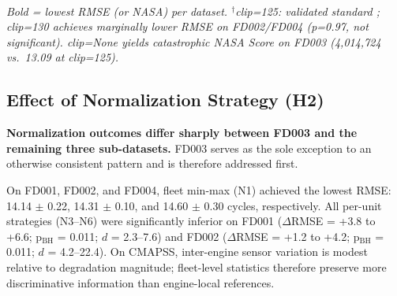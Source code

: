 \documentclass[review,12pt]{elsarticle}
\begin{document}
\begin{table}[!t]
\centering
\footnotesize
\caption{RUL clipping threshold comparison (H1): mean RMSE and NASA prognostic score across five clipping thresholds on four CMAPSS sub-datasets (linear regression (OLS), 20 runs per configuration).}
\label{tab:iv}
\\[3pt]
\begin{minipage}{\linewidth}
\footnotesize\textit{Bold = lowest RMSE (or NASA) per dataset. $^\dagger$clip=125: validated standard \cite{ref05,ref06}; clip=130 achieves marginally lower RMSE on FD002/FD004 (p=0.97, not significant). clip=None yields catastrophic NASA Score on FD003 (4,014,724 vs.\ 13.09 at clip=125).}
\end{minipage}
\end{table}


\subsection{Effect of Normalization Strategy (H2)}

\textbf{Normalization outcomes differ sharply between FD003 and the remaining three sub-datasets.} FD003 serves as the sole exception to an otherwise consistent pattern and is therefore addressed first.

On FD001, FD002, and FD004, fleet min-max (N1) achieved the lowest RMSE: 14.14 $\pm$ 0.22, 14.31 $\pm$ 0.10, and 14.60 $\pm$ 0.30 cycles, respectively. All per-unit strategies (N3--N6) were significantly inferior on FD001 ($\Delta$RMSE = +3.8 to +6.6; p$_\text{BH}$ = 0.011; $d$ = 2.3--7.6) and FD002 ($\Delta$RMSE = +1.2 to +4.2; p$_\text{BH}$ = 0.011; $d$ = 4.2--22.4). On CMAPSS, inter-engine sensor variation is modest relative to degradation magnitude; fleet-level statistics therefore preserve more discriminative information than engine-local references.
\end{document}
